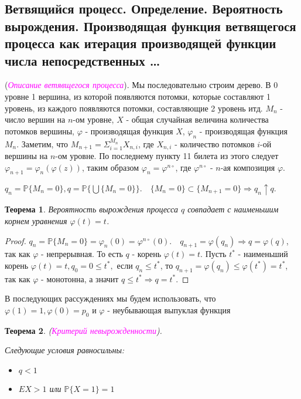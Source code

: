 \documentclass[a4paper,100pt]{article}
\theoremstyle{indented}
\newtheorem{theorem}{Теорема}
\theoremstyle{definition}
\theoremstyle{remark}
\begin{document}
\subsection{Ветвящийся процесс. Определение. Вероятность вырождения. Производящая функция ветвящегося процесса как итерация производящей функции числа непосредственных \ldots} 

(\hypertarget{n27}{\textcolor{magenta}{\textit{Описание ветявщегося процесса}}}). Мы последовательно строим дерево. В 0 уровне 1 вершина, из которой появляются потомки, которые составляют 1 уровень, из каждого появляются потомки, составляющие 2 уровень итд. $M_n$ - число вершин на $n$-ом уровне, $X$ - общая случайная величина количества потомков вершины, $\varphi$ - производящая функция $X$, $\varphi_n$ - производящая функция $M_n$. Заметим, что $M_{n+1} = \Sigma_{i=1}^{M_n}X_{n,i}$, где $X_{n,i}$ - количество потомков $i$-ой вершины на $n$-ом уровне. По последнему пункту 11 билета из этого следует $\varphi_{n+1}=\varphi_n(\varphi(z))$, таким образом $\varphi_n=\varphi^{n\circ}$, где $\varphi^{n\circ}$ - $n$-ая композиция $\varphi$. 

$q_n=\mathbb P \{M_n=0\}, q = \mathbb P \{\bigcup\{M_n=0\}\}.\quad \{M_n=0\} \subset \{M_{n+1}=0\} \Rightarrow q_n \uparrow q.$ \\
    
\begin{theorem}
  Вероятность вырождения процесса $q$ совпадает с наименьшим корнем уравнения $\varphi(t) = t$.
\end{theorem}

\begin{proof}
  $q_n=\mathbb P \{M_n=0\} = \varphi_n(0) = \varphi^{n\circ}(0). \quad q_{n+1} = \varphi(q_n) \Rightarrow q = \varphi(q)$, так как $\varphi$ -  непрерывная. То есть $q$ - корень $\varphi(t)=t$. Пусть $t^{*}$ - наименьший корень $\varphi(t) = t, q_0 = 0 \leq t^{*},$ если $q_n \leq t^{*}$, то $q_{n+1} = \varphi(q_n) \leq \varphi(t^{*}) = t^{*}$, так как $\varphi$ - монотонна, а значит $q \leq t^{*} \Rightarrow q = t^{*}$.
\end{proof}

В последующих рассуждениях мы будем использовать, что $\varphi(1)=1,\varphi(0)=p_0$ и $\varphi$ - неубывающая выпуклая функция \\ 
    
\begin{theorem}
  (\hypertarget{n28}{\textcolor{magenta}{\textit{Критерий невырожденности}}}).
    
    Следующие условия равносильны:
    \begin{itemize}
        \item $q < 1$ 
        \item $EX > 1$ или $\mathbb P \{X = 1\} = 1$
    \end{itemize}
  \end{theorem}
\end{document}
